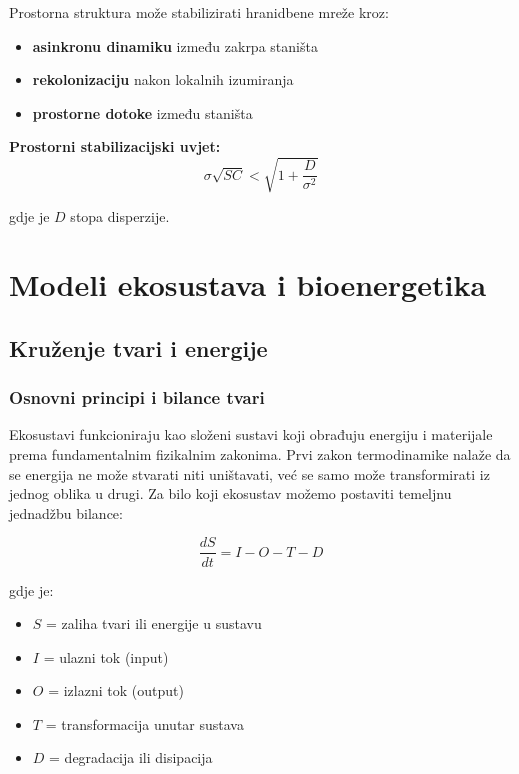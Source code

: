 \documentclass[11pt,oneside]{book}
\begin{document}
Prostorna struktura može stabilizirati hranidbene mreže kroz:

\begin{itemize}
	\item \textbf{asinkronu dinamiku} između zakrpa staništa
	\item \textbf{rekolonizaciju} nakon lokalnih izumiranja
	\item \textbf{prostorne dotoke} između staništa
\end{itemize}

\textbf{Prostorni stabilizacijski uvjet:}
\begin{equation}
	\sigma \sqrt{SC} < \sqrt{1 + \frac{D}{\sigma^2}}
\end{equation}

gdje je $D$ stopa disperzije.

	
\chapter{Modeli ekosustava i bioenergetika}

\section{Kruženje tvari i energije}

\subsection{Osnovni principi i bilance tvari}

Ekosustavi funkcioniraju kao složeni sustavi koji obrađuju energiju i materijale prema fundamentalnim fizikalnim zakonima. Prvi zakon termodinamike nalaže da se energija ne može stvarati niti uništavati, već se samo može transformirati iz jednog oblika u drugi. Za bilo koji ekosustav možemo postaviti temeljnu jednadžbu bilance:

\begin{equation}
	\frac{dS}{dt} = I - O - T - D
\end{equation}

gdje je:
\begin{itemize}
	\item $S$ = zaliha tvari ili energije u sustavu
	\item $I$ = ulazni tok (input)
	\item $O$ = izlazni tok (output) 
	\item $T$ = transformacija unutar sustava
	\item $D$ = degradacija ili disipacija
\end{itemize}
\end{document}
